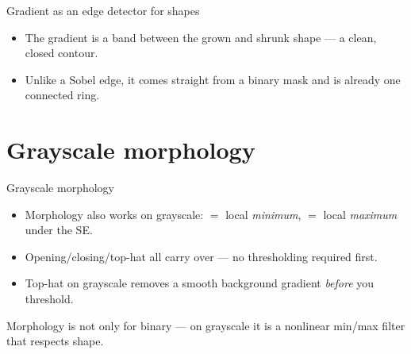 \documentclass[10pt,aspectratio=169]{beamer}
\begin{document}
\begin{frame}{Gradient as an edge detector for shapes}
  \begin{center}
  \end{center}
  \begin{itemize}
    \item The gradient is a band between the grown and shrunk shape — a clean, closed contour.
    \item Unlike a Sobel edge, it comes straight from a binary mask and is already one connected ring.
  \end{itemize}
\end{frame}

\section{Grayscale morphology}

\begin{frame}{Grayscale morphology}
  \begin{itemize}
    \item Morphology also works on grayscale:  $=$ local \emph{minimum},  $=$ local \emph{maximum} under the SE.
    \item Opening/closing/top-hat all carry over — no thresholding required first.
    \item Top-hat on grayscale removes a smooth background gradient \emph{before} you threshold.
  \end{itemize}
  \begin{keyidea}{Morphology is not only for binary — on grayscale it is a nonlinear min/max filter that respects shape.}\end{keyidea}
\end{frame}
\end{document}
